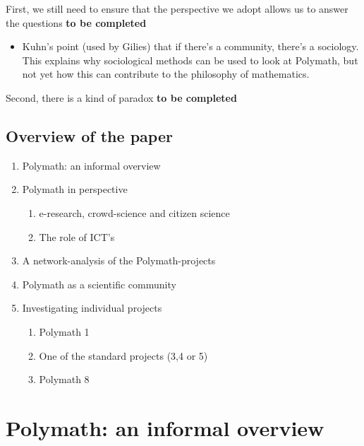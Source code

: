 \documentclass[article, floatfix, groupaddress, prb]{revtex4-1}
\providecommand{\tightlist}{%
      \setlength{\itemsep}{0pt}\setlength{\parskip}{0pt}}
\begin{document}
First, we still need to ensure that the perspective we adopt allows us
to answer the questions \textbf{to be completed}

\begin{itemize}
\tightlist
\item
  Kuhn's point (used by Gilies) that if there's a community, there's a
  sociology. This explains why sociological methods can be used to look
  at Polymath, but not yet how this can contribute to the philosophy of
  mathematics.
\end{itemize}

Second, there is a kind of paradox \textbf{to be completed}

    \subsection{Overview of the paper}\label{overview-of-the-paper}

\begin{enumerate}
\def\labelenumi{\arabic{enumi}.}
\tightlist
\item
  Polymath: an informal overview
\item
  Polymath in perspective

  \begin{enumerate}
  \def\labelenumii{\arabic{enumii}.}
  \tightlist
  \item
    e-research, crowd-science and citizen science
  \item
    The role of ICT's
  \end{enumerate}
\item
  A network-analysis of the Polymath-projects
\item
  Polymath as a scientific community
\item
  Investigating individual projects

  \begin{enumerate}
  \def\labelenumii{\arabic{enumii}.}
  \tightlist
  \item
    Polymath 1
  \item
    One of the standard projects (3,4 or 5)
  \item
    Polymath 8
  \end{enumerate}
\end{enumerate}

    \section{Polymath: an informal
overview}\label{polymath-an-informal-overview}
\end{document}
